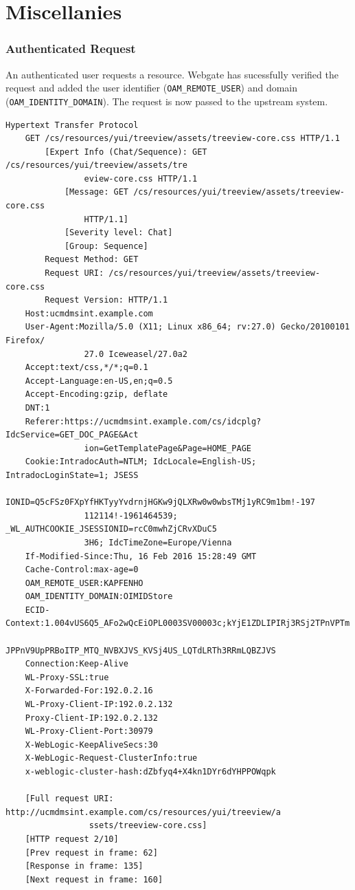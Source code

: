 
\chapter{Miscellanies}


\subsection{Authenticated Request}

An authenticated user requests a resource. Webgate has sucessfully verified the
request and added the user identifier (\verb|OAM_REMOTE_USER|) and domain
(\verb|OAM_IDENTITY_DOMAIN|). The request is now passed to the upstream system.

\scriptsize
\begin{verbatim}
Hypertext Transfer Protocol
    GET /cs/resources/yui/treeview/assets/treeview-core.css HTTP/1.1
        [Expert Info (Chat/Sequence): GET /cs/resources/yui/treeview/assets/tre
                eview-core.css HTTP/1.1
            [Message: GET /cs/resources/yui/treeview/assets/treeview-core.css 
                HTTP/1.1]
            [Severity level: Chat]
            [Group: Sequence]
        Request Method: GET
        Request URI: /cs/resources/yui/treeview/assets/treeview-core.css
        Request Version: HTTP/1.1
    Host:ucmdmsint.example.com
    User-Agent:Mozilla/5.0 (X11; Linux x86_64; rv:27.0) Gecko/20100101 Firefox/
                27.0 Iceweasel/27.0a2
    Accept:text/css,*/*;q=0.1
    Accept-Language:en-US,en;q=0.5
    Accept-Encoding:gzip, deflate
    DNT:1
    Referer:https://ucmdmsint.example.com/cs/idcplg?IdcService=GET_DOC_PAGE&Act
                ion=GetTemplatePage&Page=HOME_PAGE
    Cookie:IntradocAuth=NTLM; IdcLocale=English-US; IntradocLoginState=1; JSESS
                IONID=Q5cFSz0FXpYfHKTyyYvdrnjHGKw9jQLXRw0w0wbsTMj1yRC9m1bm!-197
                112114!-1961464539; _WL_AUTHCOOKIE_JSESSIONID=rcC0mwhZjCRvXDuC5
                3H6; IdcTimeZone=Europe/Vienna
    If-Modified-Since:Thu, 16 Feb 2016 15:28:49 GMT
    Cache-Control:max-age=0
    OAM_REMOTE_USER:KAPFENHO
    OAM_IDENTITY_DOMAIN:OIMIDStore
    ECID-Context:1.004vUS6Q5_AFo2wQcEiOPL0003SV00003c;kYjE1ZDLIPIRj3RSj2TPnVPTm
                JPPnV9UpPRBoITP_MTQ_NVBXJVS_KVSj4US_LQTdLRTh3RRmLQBZJVS
    Connection:Keep-Alive
    WL-Proxy-SSL:true
    X-Forwarded-For:192.0.2.16
    WL-Proxy-Client-IP:192.0.2.132
    Proxy-Client-IP:192.0.2.132
    WL-Proxy-Client-Port:30979
    X-WebLogic-KeepAliveSecs:30
    X-WebLogic-Request-ClusterInfo:true
    x-weblogic-cluster-hash:dZbfyq4+X4kn1DYr6dYHPPOWqpk
    
    [Full request URI: http://ucmdmsint.example.com/cs/resources/yui/treeview/a
                 ssets/treeview-core.css]
    [HTTP request 2/10]
    [Prev request in frame: 62]
    [Response in frame: 135]
    [Next request in frame: 160]
\end{verbatim}
\normalsize

